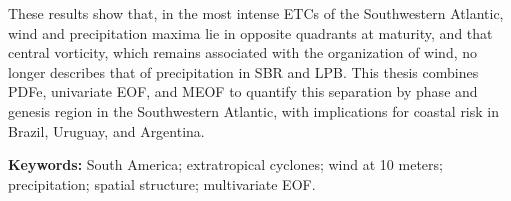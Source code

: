 These results show that, in the most intense ETCs of the Southwestern Atlantic, wind and precipitation maxima lie in opposite quadrants at maturity, and that central vorticity, which remains associated with the organization of wind, no longer describes that of precipitation in SBR and LPB.
This thesis combines PDFe, univariate EOF, and MEOF to quantify this separation by phase and genesis region in the Southwestern Atlantic, with implications for coastal risk in Brazil, Uruguay, and Argentina.

\vspace{1cm}

\noindent \textbf{Keywords:} South America; extratropical cyclones; wind at 10 meters; precipitation; spatial structure; multivariate EOF.
